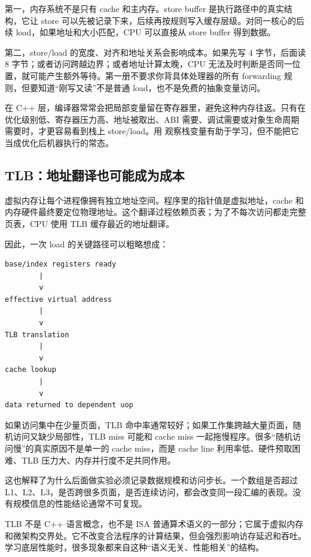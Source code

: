 第一，内存系统不是只有 cache 和主内存。store buffer 是执行路径中的真实结构，它让 store 可以先被记录下来，后续再按规则写入缓存层级。对同一核心的后续 load，如果地址和大小匹配，CPU 可以直接从 store buffer 得到数据。

第二，store/load 的宽度、对齐和地址关系会影响成本。如果先写 4 字节，后面读 8 字节；或者访问跨越边界；或者地址计算太晚，CPU 无法及时判断是否同一位置，就可能产生额外等待。第一册不要求你背具体处理器的所有 forwarding 规则，但要知道“刚写又读”不是普通 load，也不是免费的抽象变量访问。

在 C++ 层，编译器常常会把局部变量留在寄存器里，避免这种内存往返。只有在优化级别低、寄存器压力高、地址被取出、ABI 需要、调试需要或对象生命周期需要时，才更容易看到栈上 store/load。用  观察栈变量有助于学习，但不能把它当成优化后机器执行的常态。

\subsection{TLB：地址翻译也可能成为成本}

虚拟内存让每个进程像拥有独立地址空间。程序里的指针值是虚拟地址，cache 和内存硬件最终要定位物理地址。这个翻译过程依赖页表；为了不每次访问都走完整页表，CPU 使用 TLB 缓存最近的地址翻译。

因此，一次 load 的关键路径可以粗略想成：

\begin{center}
\begin{minipage}{0.84\linewidth}
\begin{verbatim}
base/index registers ready
        |
        v
effective virtual address
        |
        v
TLB translation
        |
        v
cache lookup
        |
        v
data returned to dependent uop
\end{verbatim}
\end{minipage}
\end{center}

如果访问集中在少量页面，TLB 命中率通常较好；如果工作集跨越大量页面，随机访问又缺少局部性，TLB miss 可能和 cache miss 一起拖慢程序。很多“随机访问慢”的真实原因不是单一的 cache miss，而是 cache line 利用率低、硬件预取困难、TLB 压力大、内存并行度不足共同作用。

这也解释了为什么后面做实验必须记录数据规模和访问步长。一个数组是否超过 L1、L2、L3，是否跨很多页面，是否连续访问，都会改变同一段汇编的表现。没有规模信息的性能结论通常不可复现。

\begin{deepdive}
TLB 不是 C++ 语言概念，也不是 ISA 普通算术语义的一部分；它属于虚拟内存和微架构交界处。它不改变合法程序的计算结果，但会强烈影响访存延迟和吞吐。学习底层性能时，很多现象都来自这种“语义无关、性能相关”的结构。
\end{deepdive}

